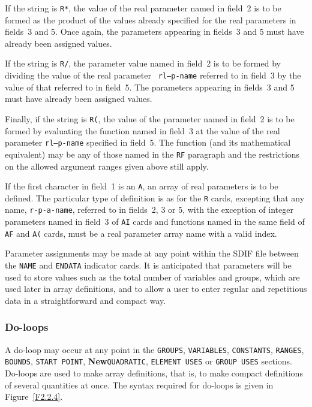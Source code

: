 \documentclass[a4paper]{article}
\begin{document}
If the string is  {\tt  R*},
the value  of the real parameter named in
field~2 is to be formed as the product of the values already specified
for the real parameters in fields~3  and 5. Once again, the parameters
appearing in fields~3 and 5 must have already been assigned values.

If the string is {\tt R/},
the parameter value named  in field~2 is to
be   formed  by dividing  the    value  of  the   real parameter  {\tt
rl--p-name} referred to in field~3  by the value of that  referred
to  in field~5. The parameters appearing  in fields~3 and 5 must  have
already been assigned values.

Finally, if the string is {\tt R(},
the value of the  parameter named
in field~2 is to be formed by evaluating the function named in field~3
at the value of  the real parameter  {\tt  rl--p-name} specified in
field~5. The function (and its mathematical equivalent)  may be any of
those named  in the {\tt  RF} paragraph and  the  restrictions on  the
allowed argument ranges given above still apply.

If the first  character  in field~1 is  an  {\tt A}, an array
of real
parameters is to be defined. The  particular type of definition is as
for the {\tt R} cards,
excepting that any name,  {\tt r-p-a-name},
referred  to  in  fields~2,  3  or  5, with  the  exception of integer
parameters named in field~3 of {\tt  AI} cards and functions  named in
the  same  field   of {\tt AF}  and  {\tt A(}  cards, must   be a real
parameter array name
with a valid index.

Parameter assignments may  be made at any  point  within the SDIF file
between the  {\tt NAME}
and {\tt  ENDATA}
indicator cards.   It is anticipated that  parameters
will be used to store values such as the total number of variables and
groups, which are used later in array
definitions, and to allow a user
to enter regular and repetitious data in a straightforward and compact
way.

\subsubsection{\label{S2.2.4}Do-loops}

A do-loop may occur at any point in the {\tt GROUPS}, {\tt VARIABLES},
{\tt CONSTANTS}, {\tt RANGES},  {\tt BOUNDS},
{\tt START POINT}, {\bf New}{\tt QUADRATIC}, {\tt ELEMENT USES} or 
{\tt GROUP USES} sections.
Do-loops are  used to make   array
definitions,  that is,   to  make compact definitions of
several quantities at once. The syntax  required for do-loops is given
in Figure~\ref{F2.2.4}.
\end{document}
